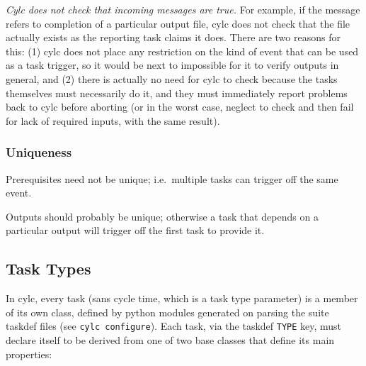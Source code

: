 \documentclass[11pt,a4paper]{article}
\begin{document}
{\em Cylc does not check that incoming messages are true.}  For example,
if the message refers to completion of a particular output file, cylc
does not check that the file actually exists as the reporting task
claims it does. There are two reasons for this: (1) cylc does not place
any restriction on the kind of event that can be used as a task trigger,
so it would be next to impossible for it to verify outputs in general,
and (2) there is actually no need for cylc to check because the tasks
themselves must necessarily do it, and they must immediately report
problems back to cylc before aborting (or in the worst case, neglect to
check and then fail for lack of required inputs, with the same result).


\subsubsection{Uniqueness}

Prerequisites need not be unique; i.e.\ multiple tasks can trigger off
the same event.

Outputs should probably be unique; otherwise a task that depends on a
particular output will trigger off the first task to provide it.


\subsection{Task Types} 
\label{TaskTypes}

In cylc, every task (sans cycle time, which is a task type parameter) is
a member of its own class, defined by python modules generated on
parsing the suite taskdef files (see \lstinline=cylc configure=).
Each task, via the taskdef \lstinline=TYPE= key, must declare itself to
be derived from one of two base classes that define its main properties:
\end{document}
